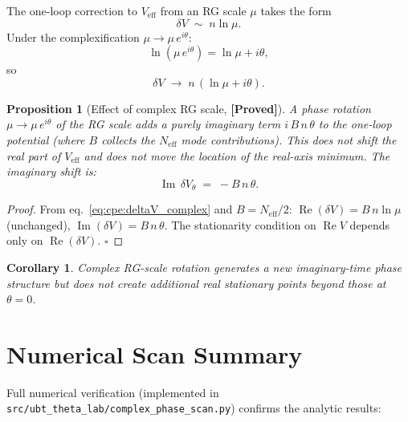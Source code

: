 \documentclass[12pt,a4paper]{article}
\newtheorem{proposition}[theorem]{Proposition}
\newtheorem{corollary}[theorem]{Corollary}
\theoremstyle{definition}
\theoremstyle{remark}
\newcommand{\Re}{\operatorname{Re}}
\newcommand{\Im}{\operatorname{Im}}
\newcommand{\PROVED}{\textbf{[Proved]}}
\begin{document}
The one-loop correction to $V_{\mathrm{eff}}$ from an RG scale $\mu$ takes the form
\begin{equation}
  \delta V \;\sim\; n\ln\mu.
  \label{eq:cpe:deltaV}
\end{equation}
Under the complexification $\mu \to \mu\,e^{i\theta}$:
\begin{equation}
  \ln(\mu\,e^{i\theta}) = \ln\mu + i\theta,
\end{equation}
so
\begin{equation}
  \delta V \;\to\; n\,(\ln\mu + i\theta).
  \label{eq:cpe:deltaV_complex}
\end{equation}

\begin{proposition}[Effect of complex RG scale, \PROVED]
\label{prop:cpe:RG}
A phase rotation $\mu \to \mu\,e^{i\theta}$ of the RG scale adds a purely
imaginary term $i\,B\,n\,\theta$ to the one-loop potential (where $B$ collects
the $N_{\mathrm{eff}}$ mode contributions).  This does not shift the real part of
$V_{\mathrm{eff}}$ and does not move the location of the real-axis minimum.
The imaginary shift is:
\begin{equation}
  \Im\,\delta V_\theta \;=\; -B\,n\,\theta.
  \label{eq:cpe:ImShift}
\end{equation}
\end{proposition}

\begin{proof}
From eq.~\eqref{eq:cpe:deltaV_complex} and $B = N_{\mathrm{eff}}/2$:
$\Re(\delta V) = B\,n\ln\mu$ (unchanged), $\Im(\delta V) = B\,n\,\theta$.
The stationarity condition on $\Re V$ depends only on $\Re(\delta V)$.
$\square$
\end{proof}

\begin{corollary}
Complex RG-scale rotation generates a new imaginary-time phase structure but does
not create additional \emph{real} stationary points beyond those at $\theta = 0$.
\end{corollary}

\section{Numerical Scan Summary}
\label{sec:cpe:scan_summary}

Full numerical verification (implemented in
\texttt{src/ubt\_theta\_lab/complex\_phase\_scan.py}) confirms the analytic
results:
\end{document}
